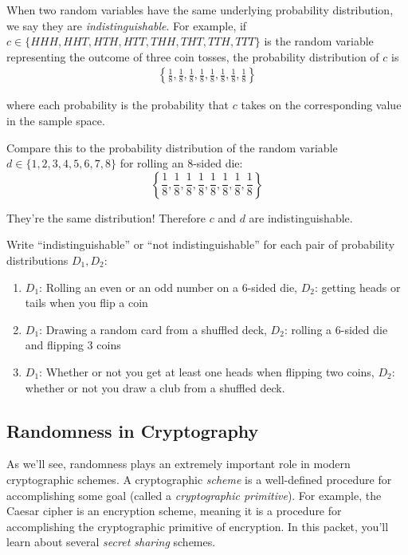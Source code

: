 When two random variables have the same underlying probability 
distribution, we say they are \emph{indistinguishable}. For example,
if $c \in \{HHH, HHT,\allowbreak HTH, HTT, THH, THT, TTH, TTT\}$ 
is the random variable representing the outcome of three coin tosses,
the probability distribution of $c$ is 
\begin{align*}
    \left\{
        \frac{1}{8},\frac{1}{8},\frac{1}{8},\frac{1}{8},
        \frac{1}{8},\frac{1}{8},\frac{1}{8},\frac{1}{8}
    \right\}
\end{align*}

where each probability is the probability that $c$ takes on the 
corresponding value in the sample space.

Compare this to the probability distribution of the random 
variable $d \in \{1,2,3,4,5,6,7,8\}$ for rolling an 8-sided die:
\[
    \left\{
        \frac{1}{8},\frac{1}{8},\frac{1}{8},\frac{1}{8},
        \frac{1}{8},\frac{1}{8},\frac{1}{8},\frac{1}{8}
    \right\}
\]

They're the same distribution! Therefore $c$ and $d$ are 
indistinguishable.

\begin{exercise}
    Write ``indistinguishable'' or ``not indistinguishable''
    for each pair of probability distributions $D_1, D_2$:
    \renewcommand{\labelenumi}{(\alph{enumi})} 
    \begin{enumerate}
        \item $D_1$: Rolling an even or an odd number on a 6-sided die, 
        $D_2$: getting heads or tails when you flip a coin
        \item $D_1$: Drawing a random card from a shuffled deck, 
        $D_2$: rolling a 6-sided die and flipping 3 coins
        \item $D_1$: Whether or not you get at least one heads when flipping
        two coins, $D_2$: whether or not you draw a club from a shuffled 
        deck.
    \end{enumerate}
\end{exercise}

\subsection{Randomness in Cryptography}

As we'll see, randomness plays an extremely important role in modern cryptographic
schemes. A cryptographic \emph{scheme} is a well-defined procedure for accomplishing 
some goal (called a \emph{cryptographic primitive}). For example, the Caesar 
cipher is an encryption scheme\footnotemark, meaning it is a procedure for accomplishing
the cryptographic primitive of encryption. 
In this packet, you'll learn about several \emph{secret sharing} schemes.

